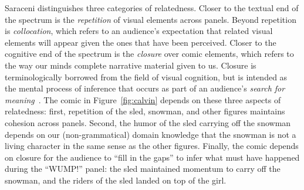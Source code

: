 %
Saraceni distinguishes three categories of relatedness.
Closer to the textual end of the spectrum is the \emph{repetition} of visual
elements across panels. Beyond repetition is \emph{collocation}, which refers
to an audience's expectation that related visual elements will appear given the
ones that have been perceived. Closer to the cognitive end of the spectrum is
the \emph{closure} over comic elements, which refers to the way our minds 
complete narrative material given to us. Closure is terminologically borrowed 
from the field of visual cognition, but is intended as the mental process 
of inference that occurs as part of an audience's 
\emph{search for meaning}~\cite{gerrig1994readers}.
%
%
The comic in Figure~\ref{fig:calvin} depends on these three 
aspects of relatedness: first, repetition of the sled, snowman, and other
figures maintains cohesion across panels. Second, the humor of the sled
carrying off the snowman depends on our (non-grammatical) domain knowledge
that the snowman is not a living character in the same sense as the other
figures. Finally, the comic depends on closure for the audience to ``fill
in the gaps'' to infer what must have happened during the ``WUMP!'' panel:
the sled maintained momentum to carry off the snowman, and the riders of
the sled landed on top of the girl.


%
%
%

